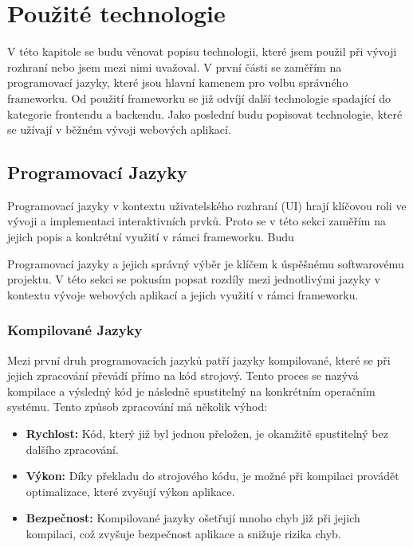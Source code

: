 \chapter{Použité technologie}
\label{ch:technology}
V této kapitole se budu věnovat popisu technologii, které jsem použil při vývoji rozhraní nebo jsem mezi nimi uvažoval. V první části se zaměřím na programovací jazyky, které jsou hlavní kamenem pro volbu správného frameworku. Od použití frameworku se již odvíjí další technologie spadající do kategorie frontendu a backendu. Jako poslední budu popisovat technologie, které se užívají v běžném vývoji webových aplikací.

\section{Programovací Jazyky}
\label{sec:languages}
Programovací jazyky v kontextu uživatelského rozhraní (UI) hrají klíčovou roli ve vývoji a implementaci interaktivních prvků. Proto se v této sekci zaměřím na jejich popis a konkrétní využití v rámci frameworku. Budu

Programovací jazyky a jejich správný výběr je klíčem k úspěšnému softwarovému projektu. V této sekci se pokusím popsat rozdíly mezi jednotlivými jazyky v kontextu vývoje webových aplikací a jejich využití v rámci frameworku.

\subsection{Kompilované Jazyky}
\label{subsec:languages-compiled}
Mezi první druh programovacích jazyků patří jazyky kompilované, které se při jejich zpracování převádí přímo na kód strojový. Tento proces se nazývá kompilace a výsledný kód je následně spustitelný na konkrétním operačním systému. Tento způsob zpracování má několik výhod:

\begin{itemize}
    \item \textbf{Rychlost:} Kód, který již byl jednou přeložen, je okamžitě spustitelný bez dalšího zpracování.
    \item \textbf{Výkon:} Díky překladu do strojového kódu, je možné při kompilaci provádět optimalizace, které zvyšují výkon aplikace.
    \item \textbf{Bezpečnost:} Kompilované jazyky ošetřují mnoho chyb již při jejich kompilaci, což zvyšuje bezpečnost aplikace a snižuje rizika chyb.
\end{itemize}

